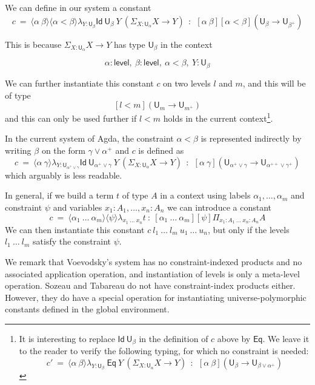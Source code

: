 \documentclass[a4paper,UKenglish,cleveref, autoref, thm-restate]{lipics-v2021}
\newcommand{\Id}{\mathsf{Id}}
\newcommand{\Eq}{\mathsf{Eq}}
\newcommand{\UU}{\mathsf{U}}
\newcommand{\Level}{\mathsf{level}}
\newcommand{\lam}[1]{{\langle}#1{\rangle}}
\begin{document}
We can define in our system a constant
$$
c~=~\lam{\alpha~\beta}\lam{\alpha<\beta}\lambda_{Y:\UU_{\beta}}\Id~{\UU_{\beta}}~Y~ (\Sigma_{X:\UU_{\alpha}}X\rightarrow Y)~~:~~
   [\alpha~\beta][\alpha<\beta](\UU_{\beta} \rightarrow \UU_{\beta^+})
$$

   This is because $\Sigma_{X:\UU_{\alpha}}X\rightarrow Y$ has type $\UU_{\beta}$ in the context

   $$\alpha:\Level,~\beta:\Level,~\alpha<\beta,~Y:\UU_{\beta}$$

   We can further instantiate this constant $c$ on two levels $l$ and $m$, and this will be of type
   $$[l<m](\UU_{m} \rightarrow \UU_{m^+})$$
   and this can only be used further if $l<m$ holds in the current
   context\footnote{It is interesting to replace $\Id~\UU_\beta$ in the
   definition of
$c$ above by $\Eq$. We leave it to the reader to verify the
following typing, for which no constraint is needed:
$$
c'~=~\lam{\alpha~\beta}\lambda_{Y:\UU_{\beta}}~\Eq~Y~ (\Sigma_{X:\UU_{\alpha}}X\rightarrow Y)~~:~~
   [\alpha~\beta](\UU_{\beta} \rightarrow \UU_{\beta\vee\alpha^+})
$$}.

\medskip


In the current system of Agda, the constraint $\alpha<\beta$ is represented indirectly by
writing $\beta$ on the form $\gamma\vee \alpha^+$ and $c$ is defined as
$$
c~=~\lam{\alpha~\gamma}\lambda_{Y:\UU_{\alpha^+\vee\gamma}}\Id~{\UU_{\alpha^+\vee\gamma}}~Y~ (\Sigma_{X:\UU_{\alpha}}X\rightarrow Y)~~:~~[\alpha~\gamma]  (\UU_{\alpha^+\vee\gamma} \rightarrow \UU_{\alpha^{++}\vee\gamma^+})
$$
   which arguably is less readable.

\medskip

In general, if we  build a term $t$ of type $A$ in a context using labels $\alpha_1,\dots,\alpha_m$
and constraint $\psi$ and variables $x_1:A_1,\dots,x_n:A_n$ we can introduce a constant
$$
c~=~ \lam{\alpha_1~\dots~\alpha_m}\lam{\psi}\lambda_{x_1~\dots~x_n}t ~:~
[\alpha_1~\dots~\alpha_m][\psi]\Pi_{x_1:A_1~\dots~x_n:A_n}A
$$
We can then instantiate this constant $c~l_1~\dots~l_m~u_1~\dots~u_n$, but only if the levels
$l_1~\dots~l_m$ satisfy the constraint $\psi$.

We remark that Voevodsky's system \cite{VV} has no constraint-indexed products and no associated application operation, and instantiation of levels is only a meta-level operation. Sozeau and Tabareau \cite{SozeauTabareau:coq} do not have constraint-index products either. However, they do have a special operation 
 for instantiating universe-polymorphic constants defined in the global environment.
\end{document}
